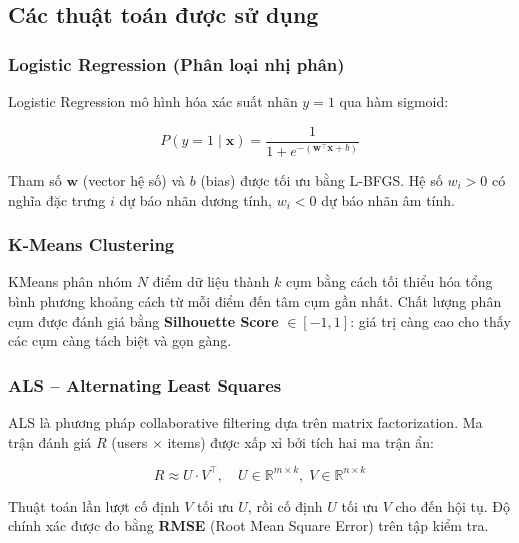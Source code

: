 \subsection{Các thuật toán được sử dụng}

\subsubsection{Logistic Regression (Phân loại nhị phân)}

Logistic Regression mô hình hóa xác suất nhãn $y=1$ qua hàm sigmoid:

$$P(y=1 \mid \mathbf{x}) = \frac{1}{1 + e^{-(\mathbf{w}^\top \mathbf{x} + b)}}$$

Tham số $\mathbf{w}$ (vector hệ số) và $b$ (bias) được tối ưu bằng L-BFGS. Hệ số $w_i > 0$ có nghĩa đặc trưng $i$ dự báo nhãn dương tính, $w_i < 0$ dự báo nhãn âm tính.

\subsubsection{K-Means Clustering}

KMeans phân nhóm $N$ điểm dữ liệu thành $k$ cụm bằng cách tối thiểu hóa tổng bình phương khoảng cách từ mỗi điểm đến tâm cụm gần nhất. Chất lượng phân cụm được đánh giá bằng \textbf{Silhouette Score} $\in [-1, 1]$: giá trị càng cao cho thấy các cụm càng tách biệt và gọn gàng.

\subsubsection{ALS -- Alternating Least Squares}

ALS là phương pháp collaborative filtering dựa trên matrix factorization. Ma trận đánh giá $R$ (users $\times$ items) được xấp xỉ bởi tích hai ma trận ẩn:

$$R \approx U \cdot V^\top, \quad U \in \mathbb{R}^{m \times k},\; V \in \mathbb{R}^{n \times k}$$

Thuật toán lần lượt cố định $V$ tối ưu $U$, rồi cố định $U$ tối ưu $V$ cho đến hội tụ. Độ chính xác được đo bằng \textbf{RMSE} (Root Mean Square Error) trên tập kiểm tra.
